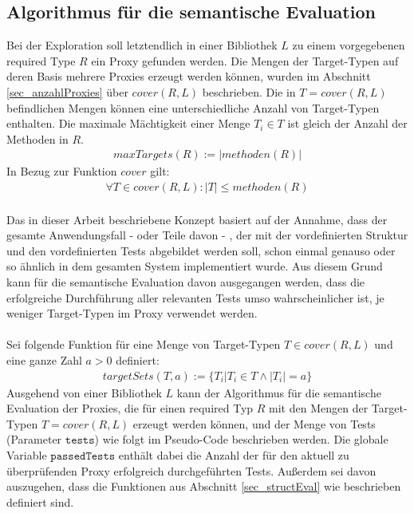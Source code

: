 \subsection{Algorithmus für die semantische Evaluation}
Bei der Exploration soll letztendlich in einer Bibliothek $L$ zu einem vorgegebenen required Type $R$ ein Proxy gefunden werden. Die Mengen der Target-Typen auf deren Basis mehrere Proxies erzeugt werden können, wurden im Abschnitt \ref{sec_anzahlProxies} über $\mathit{cover(R,L)}$ beschrieben. Die in $T = \mathit{cover(R,L)}$ befindlichen Mengen können eine unterschiedliche Anzahl von Target-Typen enthalten. Die maximale Mächtigkeit einer Menge $T_i \in T$ ist gleich der Anzahl der Methoden in $R$.
\begin{gather*}
\mathit{maxTargets(R)} := |\mathit{methoden(R)}|
\end{gather*}
\noindent
In Bezug zur Funktion $\mathit{cover}$ gilt:
\begin{gather*}
\forall T \in \mathit{cover(R,L)} : |T| \leq \mathit{methoden(R)}
\end{gather*}
\noindent
\\
Das in dieser Arbeit beschriebene Konzept basiert auf der Annahme, dass der gesamte Anwendungsfall - oder Teile davon - , der mit der vordefinierten Struktur und den vordefinierten Tests abgebildet werden soll, schon einmal genauso oder so ähnlich in dem gesamten System implementiert wurde. Aus diesem Grund kann für die semantische Evaluation davon ausgegangen werden, dass die erfolgreiche Durchführung aller relevanten Tests umso wahrscheinlicher ist, je weniger Target-Typen im Proxy verwendet werden.
\\\\
Sei folgende Funktion für eine Menge von Target-Typen $T \in \mathit{cover(R,L)}$ und eine ganze Zahl $a > 0$ definiert:
\begin{gather*}
\mathit{targetSets(T,a)} := \{T_i | T_i \in T \wedge |T_i| = a\}
\end{gather*}
\noindent
Ausgehend von einer Bibliothek $L$ kann der Algorithmus für die semantische Evaluation der Proxies, die für einen required Typ $R$ mit den Mengen der Target-Typen $T = \mathit{cover(R, L)}$ erzeugt werden können, und der Menge von Tests (Parameter $\texttt{tests}$) wie folgt im Pseudo-Code beschrieben werden. Die globale Variable $\texttt{passedTests}$ enthält dabei die Anzahl der für den aktuell zu überprüfenden Proxy erfolgreich durchgeführten Tests. Außerdem sei davon auszugehen, dass die Funktionen aus Abschnitt \ref{sec_structEval} wie beschrieben definiert sind.
